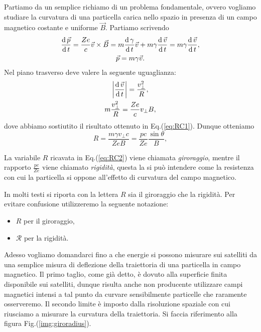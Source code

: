 Partiamo da un semplice richiamo di un problema fondamentale, ovvero vogliamo studiare la curvatura di una particella carica nello spazio in presenza di un campo magnetico costante e uniforme $\vec{B}$. Partiamo scrivendo
\begin{gather}
    \frac{\operatorname{d} \vec{p}}{\operatorname{d} t} = \frac{Ze}{c}\vec{v} \times \vec{B} = m\frac{\operatorname{d} \gamma}{\operatorname{d} t}\vec{v} + m\gamma \frac{\operatorname{d} \vec{v}}{\operatorname{d} t} = m\gamma \frac{\operatorname{d} \vec{v}}{\operatorname{d} t}, \label{eq:RC1}\\
    \vec{p} = m\gamma \vec{v}. \notag
\end{gather}
Nel piano trasverso deve valere la seguente uguaglianza:
\begin{gather*}
    \biggl| \frac{\operatorname{d} \vec{v}}{\operatorname{d} t} \biggr| = \frac{v_\bot^2}{R},\\
    m\frac{v_\bot^2}{R} = \frac{Ze}{c}v_\bot B,
\end{gather*}
dove abbiamo sostiutito il risultato ottenuto in Eq.(\ref{eq:RC1}). Dunque otteniamo
\begin{equation}
    R = \frac{m\gamma v_\bot c}{ZeB} = \frac{pc}{Ze}\frac{\sin \theta}{B},
    \label{eq:RC2}
\end{equation}
\begin{definition}
    La variabile $R$ ricavata in Eq.(\ref{eq:RC2}) viene chiamata \emph{giroraggio}, mentre il rapporto $\displaystyle\frac{pc}{Ze}$ viene chiamato \emph{rigidità}, questa la si può intendere come la resistenza con cui la particella si oppone all'effetto di curvatura del campo magnetico. 
\end{definition}
\begin{notation}
    In molti testi si riporta con la lettera $R$ sia il giroraggio che la rigidità. Per evitare confusione utilizzeremo la seguente notazione:
    \begin{itemize}
        \item $R$ per il giroraggio,
        \item $\mathcal{R}$ per la rigidità.
    \end{itemize}
\end{notation}

Adesso vogliamo domandarci fino a che energie si possono misurare sui satelliti da una semplice misura di deflezione della traiettoria di una particella in campo magnetico. Il primo taglio, come già detto, è dovuto alla superficie finita disponibile sui satelliti, dunque risulta anche non producente utilizzare campi magnetici intensi a tal punto da curvare sensibilmente particelle che raramente osserveremo. Il secondo limite è imposto dalla risoluzione spaziale con cui riusciamo a misurare la curvatura della traiettoria. Si faccia riferimento alla figura Fig.(\ref{img:giroradius}).

